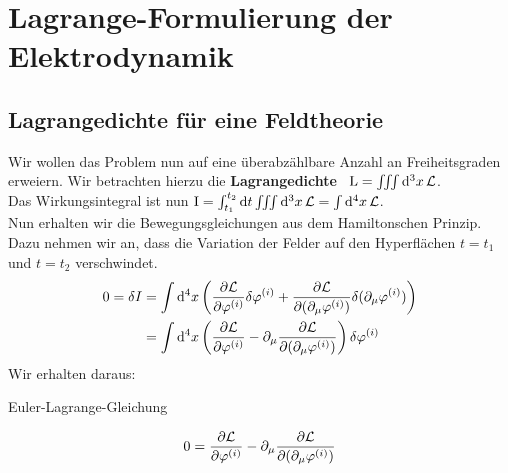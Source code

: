 \section{Lagrange-Formulierung der Elektrodynamik}
\subsection{Lagrangedichte für eine Feldtheorie}
Wir wollen das Problem nun auf eine überabzählbare Anzahl an Freiheitsgraden erweiern. Wir betrachten hierzu die \textbf{Lagrangedichte} \  $\text{L}=\iiint \dd[3]{x}  \mathcal{L}$. \\
Das Wirkungsintegral ist nun $\text{I}=\int_{t_1}^{t_2} \dd{t} \iiint \dd[3]{x}  \mathcal{L} = \int \dd[4]{x} \mathcal{L}$. \\
Nun erhalten wir die Bewegungsgleichungen aus dem Hamiltonschen Prinzip. Dazu nehmen wir an, dass die Variation der Felder auf den Hyperflächen $t=t_1$ und $t=t_2$ verschwindet.
\begin{align*}
0 = \delta I &= \int \dd[4]{x} \left( \frac{\partial\mathcal{L}}{\partial\varphi^{(i)}} \delta\varphi^{(i)} + \frac{\partial\mathcal{L}}{\partial(\partial_{\mu}\varphi^{(i)})} \delta(\partial_{\mu}\varphi^{(i)}) \right) \\
 				 &= \int \dd[4]{x} \left(\frac{\partial\mathcal{L}}{\partial\varphi^{(i)}} - \partial_{\mu} \frac{\partial\mathcal{L}}{\partial(\partial_{\mu}\varphi^{(i)})} \right) \delta\varphi^{(i)}
\end{align*}
Wir erhalten daraus:
\begin{mybox}{Euler-Lagrange-Gleichung}

\begin{align}
0=\frac{\partial\mathcal{L}}{\partial\varphi^{(i)}} - \partial_{\mu} \frac{\partial\mathcal{L}}{\partial(\partial_{\mu}\varphi^{(i)})}
\end{align}

\end{mybox}

